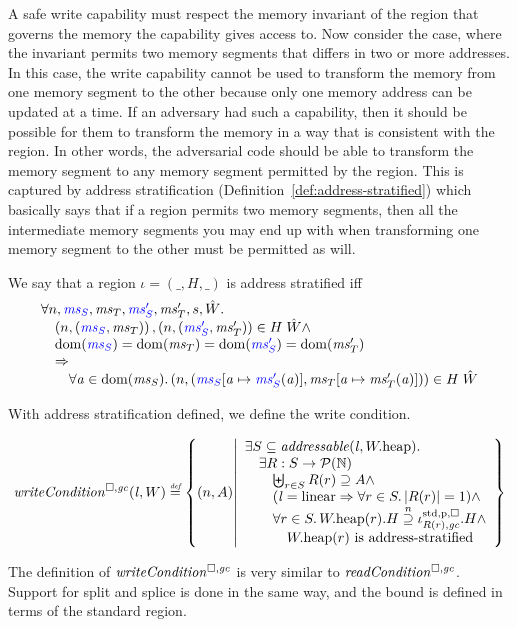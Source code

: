 \begin{jversion}
A safe write capability must respect the memory invariant of the region that governs the memory the capability gives access to.
Now consider the case, where the invariant permits two memory segments that differs in two or more addresses.
In this case, the write capability cannot be used to transform the memory from one memory segment to the other because only one memory address can be updated at a time.
If an adversary had such a capability, then it should be possible for them to transform the memory in a way that is consistent with the region.
In other words, the adversarial code should be able to transform the memory segment to any memory segment permitted by the region.
This is captured by address stratification (Definition~\ref{def:address-stratified}) which basically says that if a region permits two memory segments, then all the intermediate memory segments you may end up with when transforming one memory segment to the other must be permitted as will.
\begin{definition}
  \label{def:address-stratified}
  We say that a region $\iota = (\_,H,\_)$ is address stratified iff
  \[
    \begin{array}{l}
      \forall n, \src{\ms_S},\ms_T,\src{\ms_S'},\ms_T',s,\hat{W}\ldotp \\
      \quad \npair{\stpair{\ms}{\ms}}, \npair{\stpair[.]{\ms_S'}{\ms_T'}} \in H \; \hat{W} \wedge \\
      \quad \dom(\src{\ms_S}) = \dom(\ms_T) = \dom(\src{\ms_S'}) = \dom(\ms_T') \\
      \quad \Rightarrow \\
      \qquad \forall \aaddr \in \dom(\ms_S) \ldotp \npair{(\src{\ms_S}\update{\aaddr}{\src{\ms_S'}(\aaddr)},\ms_T\update{\aaddr}{\ms_T'(\aaddr)})} \in H \; \hat{W}
    \end{array}
  \]
\end{definition}
With address stratification defined, we define the write condition.
\begin{definition}
\[
  \writeCond{\lin,W} \defeq \left\{ \npair{A} \middle| 
    \begin{array}{l}
      \exists S \subseteq \addressable{\lin, \pwheap} \ldotp \\
      \quad \exists R : S \fun \powerset{\nats}\\
      \qquad \biguplus_{r\in S} R(r) \supseteq A \wedge\\
      \qquad (\lin = \linear \Rightarrow \forall r \in S \ldotp |R(r)|  = 1) \wedge\\
      \qquad \forall r \in S \ldotp \pwheap(r).H \nsupeq \stdreg{R(r),\gc}{\pur}.H \wedge\\
      \qquad \quad \pwheap(r) \text{ is address-stratified}
    \end{array}
  \right\}
\]
\end{definition}
The definition of $\writeCond{}$ is very similar to $\readCond{}$.
Support for split and splice is done in the same way, and the bound is defined in terms of the standard region.


\end{jversion}
